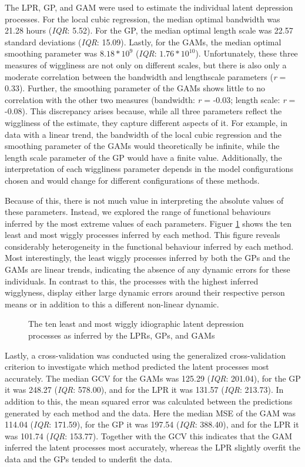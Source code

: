 \documentclass[man, floatsintext]{apa7}
\begin{document}
The LPR, GP, and GAM were used to
estimate the individual latent depression processes. For the local cubic
regression, the median optimal bandwidth was 21.28 hours (\textit{IQR}: 5.52).
For the GP, the median optimal length scale was 22.57 standard deviations
(\textit{IQR}: 15.09). Lastly, for the GAMs, the median optimal smoothing
parameter was $8.18*10^9$ (\textit{IQR}: $1.76*10^{10}$). Unfortunately, these
three measures of wiggliness are not only on different scales, but there is
also only a moderate correlation between the bandwidth and lengthscale
parameters (\textit{r} = 0.33). Further, the smoothing parameter of the GAMs
shows
little to no correlation with the other two measures (bandwidth: \textit{r} =
-0.03; length scale: \textit{r} = -0.08). This discrepancy arises because,
while all three parameters reflect the wiggliness of the estimate, they capture
different aspects of it. For example, in data with a linear trend, the
bandwidth of the local cubic regression and the smoothing parameter of the GAMs
would theoretically be infinite, while the length scale parameter of the GP
would have a finite value. Additionally, the interpretation of each
wiggliness parameter depends in the model configurations chosen and would
change for different configurations of these methods.

Because of this, there is not much value in interpreting the absolute values
of these parameters. Instead, we explored the range of functional behaviours
inferred by the most extreme values of each parameters. Figuer
\ref{fig:dem_smooth} shows
the ten least and most wiggly processes inferred by each method. This figure
reveals considerably heterogeneity in the functional behaviour inferred by
each method. Most interestingly, the least wiggly processes inferred by both
the GPs and the GAMs are linear trends, indicating the absence of any
dynamic errors for these individuals. In contrast to this, the processes
with the highest inferred wigglyness, display either large dynamic errors
around their respective person means or in addition to this a different
non-linear dynamic.

\begin{figure}[!ht]
  \caption{The ten least and most wiggly idiographic latent depression
    processes as inferred by the LPRs, GPs, and GAMs}
  \label{fig:dem_smooth}
\end{figure}

Lastly, a cross-validation was conducted using the generalized cross-validation
criterion to investigate which method predicted the latent processes most
accurately. The median GCV for the GAMs was 125.29 (\textit{IQR}: 201.04),
for the GP it was 248.27 (\textit{IQR}: 578.00), and for the LPR it was
131.57 (\textit{IQR}: 213.73). In addition to this, the mean squared error
was calculated between the predictions generated by each method and the data.
Here the median MSE of the GAM was 114.04 (\textit{IQR}: 171.59),
for the GP it was 197.54 (\textit{IQR}: 388.40), and for the LPR it was
101.74 (\textit{IQR}: 153.77). Together with the GCV this indicates that
the GAM inferred the latent processes most accurately, whereas the LPR
slightly overfit the data and the GPs tended to underfit the data.
\end{document}
